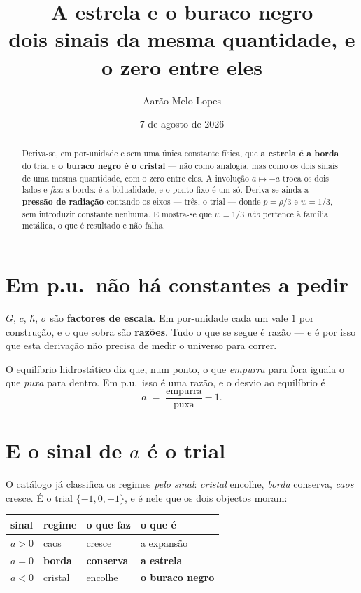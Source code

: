 \documentclass[11pt,a4paper]{article}
\title{\textbf{A estrela e o buraco negro}\\[2pt]
  {\large dois sinais da mesma quantidade, e o zero entre eles}}
\author{Aarão Melo Lopes}
\date{7 de agosto de 2026}
\begin{document}
\maketitle

\begin{abstract}
\noindent Deriva-se, em por-unidade e sem uma única constante física, que \textbf{a estrela é a
borda} do trial e \textbf{o buraco negro é o cristal} --- não como analogia, mas como os dois
sinais de uma mesma quantidade, com o zero entre eles. A involução $a\mapsto-a$ troca os dois lados
e \emph{fixa} a borda: é a bidualidade, e o ponto fixo é um só. Deriva-se ainda a
\textbf{pressão de radiação} contando os eixos --- três, o trial --- donde $p=\rho/3$ e $w=1/3$,
sem introduzir constante nenhuma. E mostra-se que $w=1/3$ \emph{não} pertence à família metálica,
o que é resultado e não falha.
\end{abstract}

\section{Em p.u.\ não há constantes a pedir}

$G$, $c$, $\hbar$, $\sigma$ são \textbf{factores de escala}. Em por-unidade cada um vale $1$ por
construção, e o que sobra são \textbf{razões}. Tudo o que se segue é razão --- e é por isso que
esta derivação não precisa de medir o universo para correr.

\smallskip
\noindent O equilíbrio hidrostático diz que, num ponto, o que \emph{empurra} para fora iguala o
que \emph{puxa} para dentro. Em p.u.\ isso é uma razão, e o desvio ao equilíbrio é
\[
  a \;=\; \frac{\text{empurra}}{\text{puxa}} - 1 .
\]

\section{E o sinal de $a$ é o trial}

O catálogo já classifica os regimes \emph{pelo sinal}: \emph{cristal} encolhe, \emph{borda}
conserva, \emph{caos} cresce. É o trial $\{-1,0,+1\}$, e é nele que os dois objectos moram:

\begin{center}\small
\begin{tabular}{@{}llll@{}}
\toprule
sinal & regime & o que faz & o que é \\
\midrule
$a>0$ & caos & cresce & a expansão \\
$a=0$ & \textbf{borda} & \textbf{conserva} & \textbf{a estrela} \\
$a<0$ & cristal & encolhe & \textbf{o buraco negro} \\
\bottomrule
\end{tabular}
\end{center}
\end{document}
